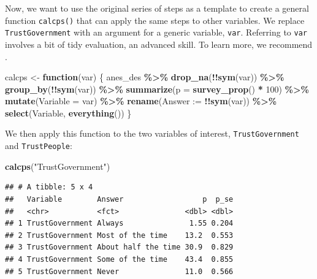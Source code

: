 \documentclass[
]{krantz}
\makeatletter
\newenvironment{Shaded}{\begin{snugshade}}{\end{snugshade}}
\newcommand{\AttributeTok}[1]{\textcolor[rgb]{0.27,0.27,0.27}{#1}}
\newcommand{\ControlFlowTok}[1]{\textcolor[rgb]{0.27,0.27,0.27}{\textbf{#1}}}
\newcommand{\DecValTok}[1]{\textcolor[rgb]{0.06,0.06,0.06}{#1}}
\newcommand{\FunctionTok}[1]{\textcolor[rgb]{0.27,0.27,0.27}{\textbf{#1}}}
\newcommand{\NormalTok}[1]{#1}
\newcommand{\OtherTok}[1]{\textcolor[rgb]{0.37,0.37,0.37}{#1}}
\newcommand{\SpecialCharTok}[1]{\textcolor[rgb]{0.43,0.43,0.43}{\textbf{#1}}}
\newcommand{\StringTok}[1]{\textcolor[rgb]{0.5,0.5,0.5}{#1}}
\newenvironment{kframe}{%
\medskip{}
\setlength{\fboxsep}{.8em}
 \def\at@end@of@kframe{}%
 \ifinner\ifhmode%
  \def\at@end@of@kframe{\end{minipage}}%
  \begin{minipage}{\columnwidth}%
 \fi\fi%
 \def\FrameCommand##1{\hskip\@totalleftmargin \hskip-\fboxsep
 \colorbox{shadecolor}{##1}\hskip-\fboxsep
     \hskip-\linewidth \hskip-\@totalleftmargin \hskip\columnwidth}%
 \MakeFramed {\advance\hsize-\width
   \@totalleftmargin\z@ \linewidth\hsize
   \@setminipage}}%
 {\par\unskip\endMakeFramed%
 \at@end@of@kframe}
\renewenvironment{Shaded}{\begin{kframe}}{\end{kframe}}
\makeatother
\begin{document}
Now, we want to use the original series of steps as a template to create a general function \texttt{calcps()} that can apply the same steps to other variables. We replace \texttt{TrustGovernment} with an argument for a generic variable, \texttt{var}. Referring to \texttt{var} involves a bit of tidy evaluation, an advanced skill. To learn more, we recommend \citet{wickham2019advanced}.

\begin{Shaded}
\begin{Highlighting}[]
\NormalTok{calcps }\OtherTok{\textless{}{-}} \ControlFlowTok{function}\NormalTok{(var) \{}
\NormalTok{  anes\_des }\SpecialCharTok{\%\textgreater{}\%}
    \FunctionTok{drop\_na}\NormalTok{(}\SpecialCharTok{!!}\FunctionTok{sym}\NormalTok{(var)) }\SpecialCharTok{\%\textgreater{}\%}
    \FunctionTok{group\_by}\NormalTok{(}\SpecialCharTok{!!}\FunctionTok{sym}\NormalTok{(var)) }\SpecialCharTok{\%\textgreater{}\%}
    \FunctionTok{summarize}\NormalTok{(}\AttributeTok{p =} \FunctionTok{survey\_prop}\NormalTok{() }\SpecialCharTok{*} \DecValTok{100}\NormalTok{) }\SpecialCharTok{\%\textgreater{}\%}
    \FunctionTok{mutate}\NormalTok{(}\AttributeTok{Variable =}\NormalTok{ var) }\SpecialCharTok{\%\textgreater{}\%}
    \FunctionTok{rename}\NormalTok{(}\AttributeTok{Answer :=} \SpecialCharTok{!!}\FunctionTok{sym}\NormalTok{(var)) }\SpecialCharTok{\%\textgreater{}\%}
    \FunctionTok{select}\NormalTok{(Variable, }\FunctionTok{everything}\NormalTok{())}
\NormalTok{\}}
\end{Highlighting}
\end{Shaded}

We then apply this function to the two variables of interest, \texttt{TrustGovernment} and \texttt{TrustPeople}:

\begin{Shaded}
\begin{Highlighting}[]
\FunctionTok{calcps}\NormalTok{(}\StringTok{"TrustGovernment"}\NormalTok{)}
\end{Highlighting}
\end{Shaded}

\begin{verbatim}
## # A tibble: 5 x 4
##   Variable        Answer                  p  p_se
##   <chr>           <fct>               <dbl> <dbl>
## 1 TrustGovernment Always               1.55 0.204
## 2 TrustGovernment Most of the time    13.2  0.553
## 3 TrustGovernment About half the time 30.9  0.829
## 4 TrustGovernment Some of the time    43.4  0.855
## 5 TrustGovernment Never               11.0  0.566
\end{verbatim}
\end{document}
